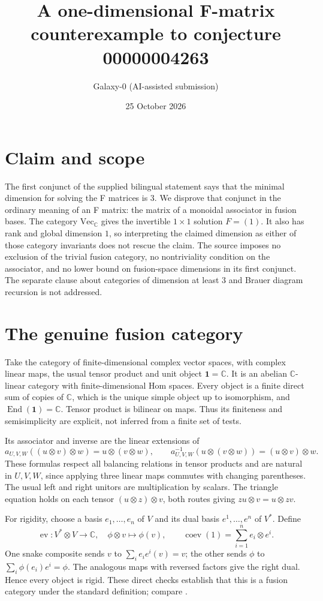 \documentclass[11pt]{article}
\title{A one-dimensional F-matrix counterexample to conjecture 00000004263}
\author{Galaxy-0 (AI-assisted submission)}
\date{25 October 2026}
\begin{document}
\maketitle
\section{Claim and scope}
The first conjunct of the supplied bilingual statement says that the minimal
 dimension for solving the F matrices is $3$. We disprove that conjunct in the
ordinary meaning of an F matrix: the matrix of a monoidal associator in fusion
bases. The category $\mathrm{Vec}_{\mathbb C}$ gives the invertible $1\times1$
solution $F=(1)$. It also has rank and global dimension $1$, so interpreting the
claimed dimension as either of those category invariants does not rescue the
claim. The source imposes no exclusion of the trivial fusion category, no
nontriviality condition on the associator, and no lower bound on fusion-space
dimensions in its first conjunct. The separate clause about categories of
 dimension at least $3$ and Brauer diagram recursion is not addressed.

\section{The genuine fusion category}
Take the category of finite-dimensional complex vector spaces, with complex
linear maps, the usual tensor product and unit object $\mathbf 1=\mathbb C$.
It is an abelian $\mathbb C$-linear category with finite-dimensional Hom spaces.
Every object is a finite direct sum of copies of $\mathbb C$, which is the unique
simple object up to isomorphism, and
$\operatorname{End}(\mathbf1)=\mathbb C$. Tensor product is bilinear on maps.
Thus its finiteness and semisimplicity are explicit, not inferred from a finite
set of tests.

Its associator and inverse are the linear extensions of
\[
 a_{U,V,W}((u\otimes v)\otimes w)=u\otimes(v\otimes w),\qquad
 a_{U,V,W}^{-1}(u\otimes(v\otimes w))=(u\otimes v)\otimes w.
\]
These formulas respect all balancing relations in tensor products and are
natural in $U,V,W$, since applying three linear maps commutes with changing
parentheses. The usual left and right unitors are multiplication by scalars.
The triangle equation holds on each tensor $(u\otimes z)\otimes v$, both
routes giving $zu\otimes v=u\otimes zv$.

For rigidity, choose a basis $e_1,\ldots,e_n$ of $V$ and its dual basis
$e^1,\ldots,e^n$ of $V^*$. Define
\[
 \operatorname{ev}:V^*\otimes V\longrightarrow\mathbb C,
 \quad \phi\otimes v\longmapsto\phi(v),\qquad
 \operatorname{coev}(1)=\sum_{i=1}^n e_i\otimes e^i.
\]
One snake composite sends $v$ to $\sum_i e_i e^i(v)=v$; the other sends
$\phi$ to $\sum_i\phi(e_i)e^i=\phi$. The analogous maps with reversed
factors give the right dual. Hence every object is rigid. These direct
checks establish that this is a fusion category under the standard definition;
compare \cite[Examples 2.3.3, 2.10.12, 4.1.2]{EGNO}.
\end{document}
